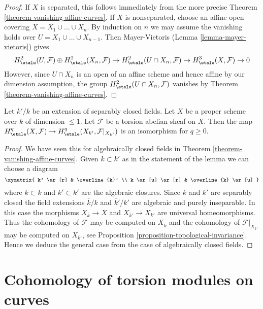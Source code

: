 \begin{proof}
If $X$ is separated, this follows immediately from the more precise
Theorem \ref{theorem-vanishing-affine-curves}.
If $X$ is nonseparated, choose an affine open covering
$X = X_1 \cup \ldots \cup X_n$. By induction on $n$ we may assume
the vanishing holds over $U = X_1 \cup \ldots \cup X_{n - 1}$.
Then Mayer-Vietoris (Lemma \ref{lemma-mayer-vietoris}) gives
$$
H^2_\etale(U, \mathcal{F}) \oplus H^2_\etale(X_n, \mathcal{F}) \to
H^2_\etale(U \cap X_n, \mathcal{F}) \to
H^3_\etale(X, \mathcal{F}) \to 0
$$
However, since $U \cap X_n$ is an open of an affine scheme
and hence affine by our dimension assumption, the group
$H^2_\etale(U \cap X_n, \mathcal{F})$ vanishes
by Theorem \ref{theorem-vanishing-affine-curves}.
\end{proof}

\begin{lemma}
\label{lemma-base-change-dim-1-separably-closed}
Let $k'/k$ be an extension of separably closed fields.
Let $X$ be a proper scheme over $k$ of dimension $\leq 1$.
Let $\mathcal{F}$ be a torsion abelian sheaf on $X$.
Then the map $H^q_\etale(X, \mathcal{F}) \to
H^q_\etale(X_{k'}, \mathcal{F}|_{X_{k'}})$ is an isomorphism
for $q \geq 0$.
\end{lemma}

\begin{proof}
We have seen this for algebraically closed fields in
Theorem \ref{theorem-vanishing-affine-curves}.
Given $k \subset k'$ as in the statement of the lemma we can
choose a diagram
$$
\xymatrix{
k' \ar[r] & \overline{k}' \\
k \ar[u] \ar[r] & \overline{k} \ar[u]
}
$$
where $k \subset \overline{k}$ and $k' \subset \overline{k}'$ are
the algebraic closures. Since $k$ and $k'$ are separably closed
the field extensions
$\overline{k}/k$ and $\overline{k}'/k'$
are algebraic and purely inseparable. In this case the morphisms
$X_{\overline{k}} \to X$ and $X_{\overline{k}'} \to X_{k'}$
are universal homeomorphisms. Thus the cohomology of $\mathcal{F}$
may be computed on $X_{\overline{k}}$ and the cohomology
of $\mathcal{F}|_{X_{k'}}$ may be computed on $X_{\overline{k}'}$,
see Proposition \ref{proposition-topological-invariance}.
Hence we deduce the general case from the case of algebraically
closed fields.
\end{proof}






\section{Cohomology of torsion modules on curves}
\label{section-vanishing-torsion-coefficients}


